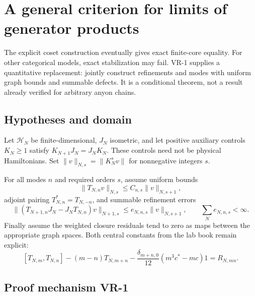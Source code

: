 \section{A general criterion for limits of generator products}

The explicit coset construction eventually gives exact finite-core equality.
For other categorical models, exact stabilization may fail. VR-1 supplies
a quantitative replacement: jointly construct refinements and modes with
uniform graph bounds and summable defects. It is a conditional theorem, not
a result already verified for arbitrary anyon chains.

\subsection{Hypotheses and domain}

Let $\mathcal H_N$ be finite-dimensional, $J_N$ isometric, and let positive
auxiliary controls $K_N\ge1$ satisfy $K_{N+1}J_N=J_NK_N$. These controls
need not be physical Hamiltonians. Set
$\|v\|_{N,s}=\|K_N^sv\|$ for nonnegative integers $s$.

For all modes $n$ and required orders $s$, assume uniform bounds
\[
 \|T_{N,n}v\|_{N,s}\le C_{n,s}\|v\|_{N,s+1},
\]
adjoint pairing $T_{N,n}^*=T_{N,-n}$, and summable refinement errors
\[
 \|(T_{N+1,n}J_N-J_NT_{N,n})v\|_{N+1,s}
 \le e_{N,n,s}\|v\|_{N,s+1},\qquad \sum_Ne_{N,n,s}<\infty.
\]
Finally assume the weighted closure residuals tend to zero as maps between
the appropriate graph spaces. Both central constants from the lab book
remain explicit:
\[
 [T_{N,m},T_{N,n}]-(m-n)T_{N,m+n}
 -\frac{\delta_{m+n,0}}{12}(m^3c^*-mc)1=R_{N,mn}.
\]

\subsection{Proof mechanism VR-1}


